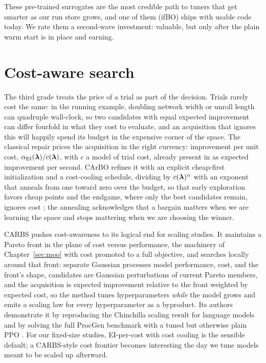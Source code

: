 These pre-trained surrogates are the most credible path to tuners
that get smarter as our run store grows, and one of them (ifBO) ships
with usable code today. We rate them a second-wave investment:
valuable, but only after the plain warm start is in place and
earning.

\section{Cost-aware search}

The third grade treats the price of a trial as part of the decision.
Trials rarely cost the same: in the running example, doubling network
width or unroll length can quadruple wall-clock, so two candidates with
equal expected improvement can differ fourfold in what they cost to
evaluate, and an acquisition that ignores this will happily spend its
budget in the expensive corner of the space. The classical repair prices
the acquisition in the right currency: improvement per unit cost,
$\alpha_{\mathrm{EI}}(\bm{\lambda}) / c(\bm{\lambda})$, with $c$ a model of trial
cost, already present in \citet{snoek2012practical} as expected
improvement per second. CArBO refines it with an explicit cheap-first
initialization and a cost-cooling schedule, dividing by
$c(\bm{\lambda})^{\alpha}$ with an exponent that anneals from one toward
zero over the budget, so that early exploration favors cheap points and
the endgame, where only the best candidates remain, ignores cost
\citep{lee2020carbo}; the annealing acknowledges that a bargain matters
when we are learning the space and stops mattering when we are
choosing the winner.

CARBS pushes cost-awareness to its logical end for scaling studies. It
maintains a Pareto front in the plane of cost versus performance, the
machinery of Chapter~\ref{sec:moo} with cost promoted to a full
objective, and searches locally around that front: separate Gaussian
processes model performance, cost, and the front's shape, candidates are
Gaussian perturbations of current Pareto members, and the acquisition is
expected improvement relative to the front weighted by expected cost, so
the method tunes hyperparameters \emph{while} the model grows and emits
a scaling law for every hyperparameter as a byproduct. Its authors
demonstrate it by reproducing the Chinchilla scaling result for language
models and by solving the full ProcGen benchmark with a tuned but
otherwise plain PPO \citep{fetterman2023carbs}. For our fixed-size
studies, EI-per-cost with cost cooling is the sensible default; a
CARBS-style cost frontier becomes interesting the day we tune models
meant to be scaled up afterward.

